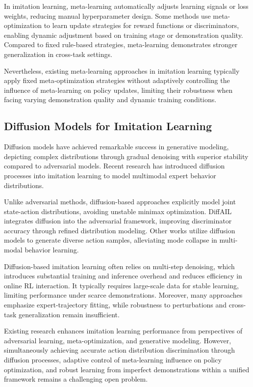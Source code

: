 \documentclass[lettersize,journal]{IEEEtran}
\begin{document}
In imitation learning, meta-learning automatically adjusts learning signals or loss weights, reducing manual hyperparameter design. Some methods use meta-optimization to learn update strategies for reward functions or discriminators, enabling dynamic adjustment based on training stage or demonstration quality. Compared to fixed rule-based strategies, meta-learning demonstrates stronger generalization in cross-task settings.

Nevertheless, existing meta-learning approaches in imitation learning typically apply fixed meta-optimization strategies without adaptively controlling the influence of meta-learning on policy updates, limiting their robustness when facing varying demonstration quality and dynamic training conditions.
\subsection{Diffusion Models for Imitation Learning}
Diffusion models have achieved remarkable success in generative modeling, depicting complex distributions through gradual denoising with superior stability compared to adversarial models. Recent research has introduced diffusion processes into imitation learning to model multimodal expert behavior distributions.

Unlike adversarial methods, diffusion-based approaches explicitly model joint state-action distributions, avoiding unstable minimax optimization. DiffAIL integrates diffusion into the adversarial framework, improving discriminator accuracy through refined distribution modeling. Other works utilize diffusion models to generate diverse action samples, alleviating mode collapse in multi-modal behavior learning.

Diffusion-based imitation learning often relies on multi-step denoising, which introduces substantial training and inference overhead and reduces efficiency in online RL interaction. It typically requires large-scale data for stable learning, limiting performance under scarce demonstrations. Moreover, many approaches emphasize expert-trajectory fitting, while robustness to perturbations and cross-task generalization remain insufficient.

Existing research enhances imitation learning performance from perspectives of adversarial learning, meta-optimization, and generative modeling. However, simultaneously achieving accurate action distribution discrimination through diffusion processes, adaptive control of meta-learning influence on policy optimization, and robust learning from imperfect demonstrations within a unified framework remains a challenging open problem.
\end{document}
